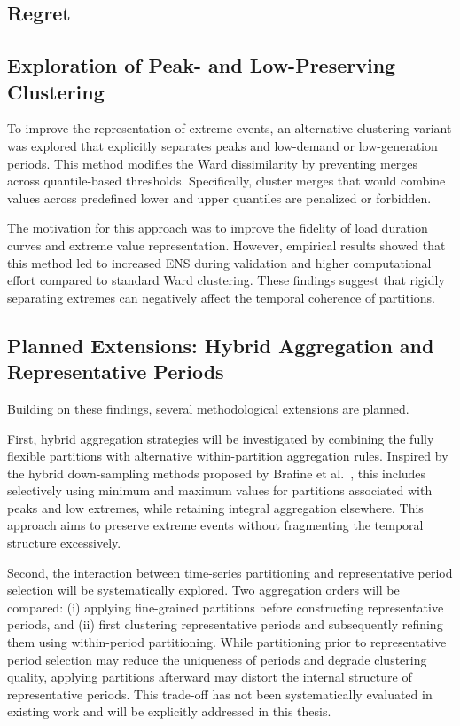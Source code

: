 \subsection{Regret}
\label{section:Methodology.Regret}

\subsection{Exploration of Peak- and Low-Preserving Clustering}

To improve the representation of extreme events, an alternative clustering variant was explored that explicitly separates peaks and low-demand or low-generation periods. This method modifies the Ward dissimilarity by preventing merges across quantile-based thresholds. Specifically, cluster merges that would combine values across predefined lower and upper quantiles are penalized or forbidden.

The motivation for this approach was to improve the fidelity of load duration curves and extreme value representation. However, empirical results showed that this method led to increased ENS during validation and higher computational effort compared to standard Ward clustering. These findings suggest that rigidly separating extremes can negatively affect the temporal coherence of partitions.

\subsection{Planned Extensions: Hybrid Aggregation and Representative Periods}

Building on these findings, several methodological extensions are planned.

First, hybrid aggregation strategies will be investigated by combining the fully flexible partitions with alternative within-partition aggregation rules. Inspired by the hybrid down-sampling methods proposed by Brafine et al.~\cite{Brafine2024}, this includes selectively using minimum and maximum values for partitions associated with peaks and low extremes, while retaining integral aggregation elsewhere. This approach aims to preserve extreme events without fragmenting the temporal structure excessively.

Second, the interaction between time-series partitioning and representative period selection will be systematically explored. Two aggregation orders will be compared: (i) applying fine-grained partitions before constructing representative periods, and (ii) first clustering representative periods and subsequently refining them using within-period partitioning. While partitioning prior to representative period selection may reduce the uniqueness of periods and degrade clustering quality, applying partitions afterward may distort the internal structure of representative periods. This trade-off has not been systematically evaluated in existing work and will be explicitly addressed in this thesis.

